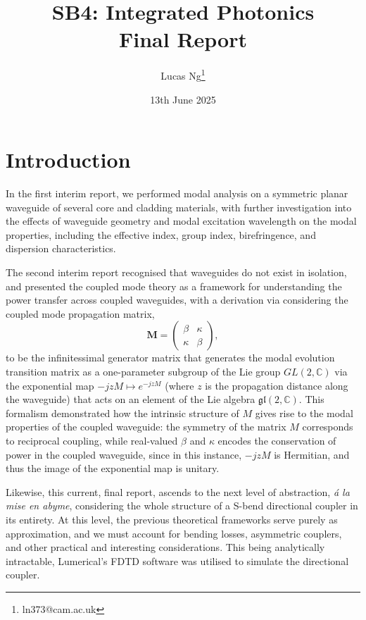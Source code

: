 \documentclass[10pt, a4paper]{article}
\title{\Large \bfseries SB4: Integrated Photonics\\[0.5em] \large Final Report}
\author{Lucas Ng\thanks{ln373@cam.ac.uk}}
\date{13th June 2025}
\begin{document}
\maketitle

\section{Introduction}

In the first interim report, we performed modal analysis on a symmetric planar waveguide
of several core and cladding materials, with further investigation into the effects of waveguide geometry and modal excitation wavelength on the modal properties,
including the effective index, group index, birefringence, and dispersion characteristics.

The second interim report recognised that waveguides do not exist in isolation,
and presented the coupled mode theory as a framework for understanding the power transfer across coupled waveguides,
with a derivation via considering the coupled mode propagation matrix,
\[
\mathbf{M} = \begin{pmatrix}
\beta & \kappa \\
\kappa & \beta
\end{pmatrix},
\]
to be the infinitessimal generator matrix that generates the modal evolution transition matrix as 
a one-parameter subgroup of the Lie group \(GL(2, \mathbb{C})\)
via the exponential map \(-jzM\mapsto e^{-jzM}\) (where \(z\) is the propagation distance along the waveguide)
that acts on an element of the Lie algebra \(\mathfrak{gl}(2, \mathbb{C})\).
This formalism demonstrated how the intrinsic structure of \(M\) gives rise to the modal properties of the coupled waveguide:
the symmetry of the matrix \(M\) corresponds to reciprocal coupling,
while real-valued \(\beta\) and \(\kappa\) encodes the conservation of power in the coupled waveguide,
since in this instance, \(-jzM\) is Hermitian, and thus the image of the exponential map is unitary.

Likewise, this current, final report, ascends to the next level of abstraction,
\textit{\'a la mise en abyme},
considering the whole structure of a S-bend directional coupler in its entirety.
At this level, the previous theoretical frameworks serve purely as approximation,
and we must account for bending losses, asymmetric couplers, and other practical and interesting considerations.
This being analytically intractable, Lumerical's FDTD software\autocite{lumerical_fdtd} was utilised to simulate the directional coupler.
\end{document}
